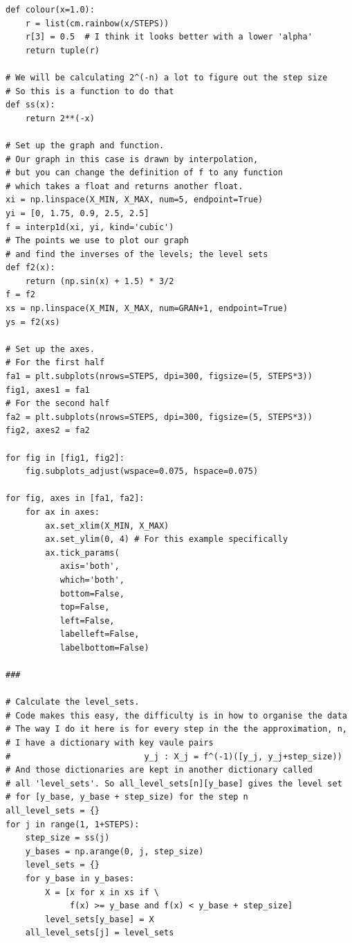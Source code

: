 \begin{verbatim}
def colour(x=1.0):
    r = list(cm.rainbow(x/STEPS))
    r[3] = 0.5  # I think it looks better with a lower 'alpha'
    return tuple(r)

# We will be calculating 2^(-n) a lot to figure out the step size
# So this is a function to do that
def ss(x):
    return 2**(-x)

# Set up the graph and function.
# Our graph in this case is drawn by interpolation,
# but you can change the definition of f to any function
# which takes a float and returns another float.
xi = np.linspace(X_MIN, X_MAX, num=5, endpoint=True)
yi = [0, 1.75, 0.9, 2.5, 2.5]
f = interp1d(xi, yi, kind='cubic')
# The points we use to plot our graph
# and find the inverses of the levels; the level sets
def f2(x):
    return (np.sin(x) + 1.5) * 3/2
f = f2
xs = np.linspace(X_MIN, X_MAX, num=GRAN+1, endpoint=True)
ys = f2(xs)

# Set up the axes.
# For the first half
fa1 = plt.subplots(nrows=STEPS, dpi=300, figsize=(5, STEPS*3))
fig1, axes1 = fa1
# For the second half
fa2 = plt.subplots(nrows=STEPS, dpi=300, figsize=(5, STEPS*3))
fig2, axes2 = fa2

for fig in [fig1, fig2]:
    fig.subplots_adjust(wspace=0.075, hspace=0.075)

for fig, axes in [fa1, fa2]:
    for ax in axes:
        ax.set_xlim(X_MIN, X_MAX)
        ax.set_ylim(0, 4) # For this example specifically
        ax.tick_params(
           axis='both',
           which='both',
           bottom=False,
           top=False,
           left=False,
           labelleft=False,
           labelbottom=False)

###

# Calculate the level_sets.
# Code makes this easy, the difficulty is in how to organise the data
# The way I do it here is for every step in the the approximation, n,
# I have a dictionary with key vaule pairs 
#                           y_j : X_j = f^(-1)([y_j, y_j+step_size))
# And those dictionaries are kept in another dictionary called 
# all 'level_sets'. So all_level_sets[n][y_base] gives the level set
# for [y_base, y_base + step_size) for the step n
all_level_sets = {}
for j in range(1, 1+STEPS):
    step_size = ss(j)
    y_bases = np.arange(0, j, step_size)
    level_sets = {}
    for y_base in y_bases:
        X = [x for x in xs if \
             f(x) >= y_base and f(x) < y_base + step_size]
        level_sets[y_base] = X
    all_level_sets[j] = level_sets


\end{verbatim}
